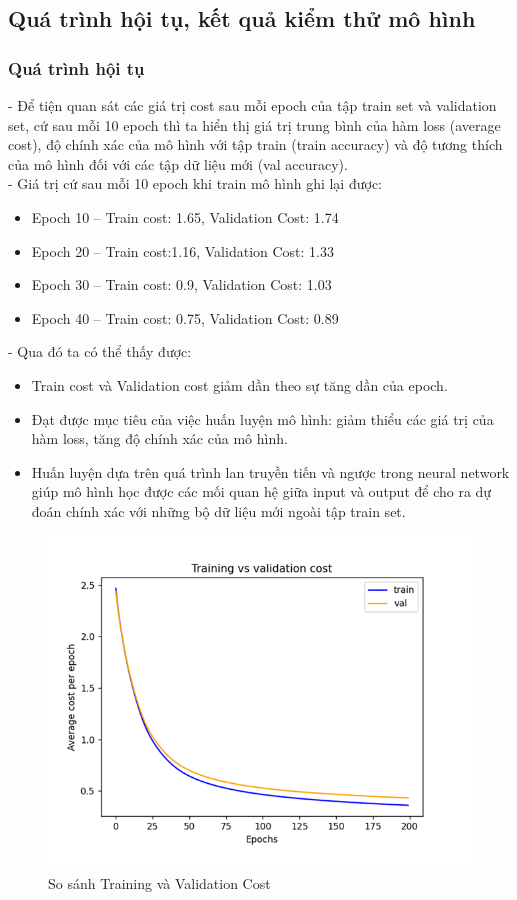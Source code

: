 \subsection{Quá trình hội tụ, kết quả kiểm thử mô hình}
\subsubsection{Quá trình hội tụ}
- Để tiện quan sát các giá trị cost sau mỗi epoch của tập train set và validation set, cứ sau mỗi 10 epoch thì ta hiển thị giá trị trung bình của hàm loss (average cost), độ chính xác của mô hình với tập train (train accuracy) và độ tương thích của mô hình đối với các tập dữ liệu mới (val accuracy).
\\- Giá trị cứ sau mỗi 10 epoch khi train mô hình ghi lại được: 
\begin{itemize}
    \item Epoch 10 – Train cost: 1.65, Validation Cost: 1.74 
    \item Epoch 20 – Train cost:1.16, Validation Cost: 1.33 
    \item Epoch 30 – Train cost: 0.9, Validation Cost: 1.03 
    \item Epoch 40 – Train cost: 0.75, Validation Cost: 0.89 
\end{itemize}
- Qua đó ta có thể thấy được: 
\begin{itemize}
    \item Train cost và Validation cost giảm dần theo sự tăng dần của epoch. 
    \item Đạt được mục tiêu của việc huấn luyện mô hình: giảm thiểu các giá trị của hàm loss, tăng độ chính xác của mô hình. 
    \item Huấn luyện dựa trên quá trình lan truyền tiến và ngược trong neural network giúp mô hình học được các mối quan hệ giữa input và output để cho ra dự đoán chính xác với những bộ dữ liệu mới ngoài tập train set. 
\end{itemize}
\begin{figure}[H]
    \centering
    \includegraphics[width=0.75\linewidth]{img/hoitu.png}
    \caption{So sánh Training và Validation Cost}
\end{figure}
